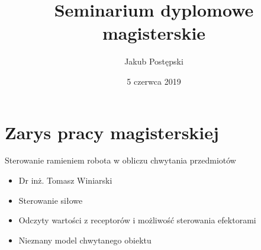 \documentclass{beamer}
\begin{document}
\title{Seminarium dyplomowe magisterskie}
\author{Jakub Postępski}
\date{5 czerwca 2019}

\frame{\titlepage}

\section{Zarys pracy magisterskiej}
\begin{frame}{Sterowanie ramieniem robota w obliczu chwytania przedmiotów}

\begin{itemize}
\item Dr inż. Tomasz Winiarski
\end{itemize}

\begin{itemize}
\item Sterowanie siłowe
\item Odczyty wartości z receptorów i możliwość sterowania efektorami
\item Nieznany model chwytanego obiektu
\end{itemize}
\end{frame}
\end{document}
